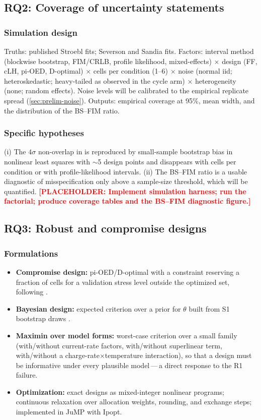 \documentclass[11pt,letterpaper]{article}
\newcommand{\dash}{\,---\,}
\newcommand{\ph}[1]{\textcolor{red}{\textbf{[PLACEHOLDER: #1]}}}
\newcommand{\RQ}[1]{\textbf{RQ#1}}
\begin{document}
\subsection{\RQ2: Coverage of uncertainty statements}
\subsubsection{Simulation design}
Truths: published Stroebl fits; Severson and Sandia fits. Factors: interval method (blockwise bootstrap, FIM/CRLB, profile likelihood, mixed-effects) $\times$ design (FF, cLH, pi-OED, D-optimal) $\times$ cells per condition (1--6) $\times$ noise (normal iid; heteroskedastic; heavy-tailed as observed in the cycle arm) $\times$ heterogeneity (none; random effects). Noise levels will be calibrated to the empirical replicate spread (\cref{sec:prelim-noise}). Outputs: empirical coverage at 95\%, mean width, and the distribution of the BS--FIM ratio.
\subsubsection{Specific hypotheses}
(i) The $4\sigma$ non-overlap in \cite{stroebl2026} is reproduced by small-sample bootstrap bias in nonlinear least squares with $\sim$5 design points and disappears with cells per condition or with profile-likelihood intervals. (ii) The BS--FIM ratio is a usable diagnostic of misspecification only above a sample-size threshold, which will be quantified. \ph{Implement simulation harness; run the factorial; produce coverage tables and the BS--FIM diagnostic figure.}

\subsection{\RQ3: Robust and compromise designs}
\subsubsection{Formulations}
\begin{itemize}
  \item \textbf{Compromise design:} pi-OED/D-optimal with a constraint reserving a fraction of cells for a validation stress level outside the optimized set, following \cite{limyum2011}.
  \item \textbf{Bayesian design:} expected criterion over a prior for $\theta$ built from S1 bootstrap draws \cite{chaloner1995}.
  \item \textbf{Maximin over model forms:} worst-case criterion over a small family (with/without current-rate factors, with/without superlinear term, with/without a charge-rate$\times$temperature interaction), so that a design must be informative under every plausible model\dash a direct response to the R1 failure.
  \item \textbf{Optimization:} exact designs as mixed-integer nonlinear programs; continuous relaxation over allocation weights, rounding, and exchange steps; implemented in JuMP with Ipopt.
\end{itemize}
\end{document}

